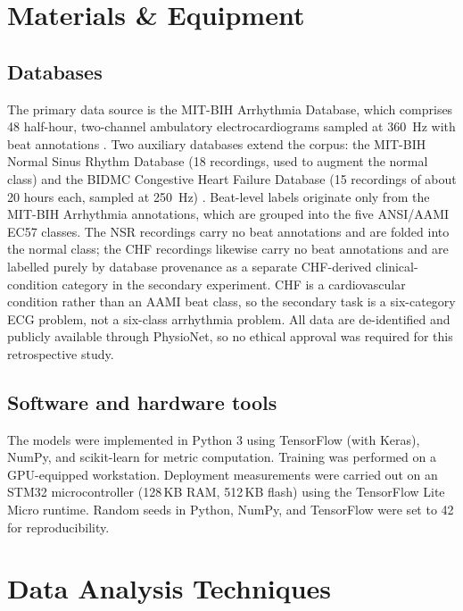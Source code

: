 \section{Materials \& Equipment}
\label{sec:materials}

\subsection{Databases}

The primary data source is the MIT-BIH Arrhythmia Database, which comprises
48 half-hour, two-channel ambulatory electrocardiograms sampled at 360~Hz
with beat annotations \cite{moody2001mitbih,goldberger2000physionet}. Two
auxiliary databases extend the corpus: the MIT-BIH Normal Sinus Rhythm
Database (18 recordings, used to augment the normal class) and the BIDMC
Congestive Heart Failure Database (15 recordings of about 20 hours each,
sampled at 250~Hz) \cite{goldberger2000physionet,baim1986chf}. Beat-level
labels originate only from the MIT-BIH Arrhythmia annotations, which are
grouped into the five ANSI/AAMI EC57 classes. The NSR recordings carry no
beat annotations and are folded into the normal class; the CHF recordings
likewise carry no beat annotations and are labelled purely by database
provenance as a separate CHF-derived clinical-condition category in the
secondary experiment. CHF is a cardiovascular condition rather than an
AAMI beat class, so the secondary task is a six-category ECG problem, not a
six-class arrhythmia problem. All data are
de-identified and publicly available through PhysioNet, so no ethical
approval was required for this retrospective study.

\subsection{Software and hardware tools}

The models were implemented in Python 3 using TensorFlow (with Keras),
NumPy, and scikit-learn for metric computation. Training was performed on a
GPU-equipped workstation. Deployment measurements were carried out on an
STM32 microcontroller (128\,KB RAM, 512\,KB flash) using the TensorFlow Lite
Micro runtime. Random seeds in Python, NumPy, and TensorFlow were set to 42
for reproducibility.


\section{Data Analysis Techniques}
\label{sec:data_analysis}

